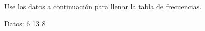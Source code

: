 \documentclass{cdplf-prueba}
\begin{document}
\subsection{}

Use los datos a continuación para llenar la tabla de frecuencias.

\underline{Datos:} \hspace{4pt} 6 \hspace{4pt}\textbullet\hspace{4pt} 13 \hspace{4pt}\textbullet\hspace{4pt} 8 \hspace{4pt}\textbullet\hspace{4pt} 
\end{document}
